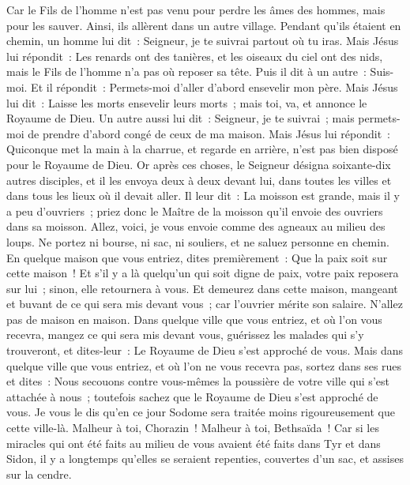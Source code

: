 \begin{multicols}{2}
Car le Fils de l'homme n'est pas venu pour perdre les âmes des hommes, mais pour les sauver. Ainsi, ils allèrent dans un autre village.
Pendant qu'ils étaient en chemin, un homme lui dit~: Seigneur, je te suivrai partout où tu iras.
Mais Jésus lui répondit~: Les renards ont des tanières, et les oiseaux du ciel ont des nids, mais le Fils de l'homme n'a pas où reposer sa tête.
Puis il dit à un autre~: Suis-moi. Et il répondit~: Permets-moi d'aller d'abord ensevelir mon père.
Mais Jésus lui dit~: Laisse les morts ensevelir leurs morts~; mais toi, va, et annonce le Royaume de Dieu.
Un autre aussi lui dit~: Seigneur, je te suivrai~; mais permets-moi de prendre d'abord congé de ceux de ma maison.
Mais Jésus lui répondit~: Quiconque met la main à la charrue, et regarde en arrière, n'est pas bien disposé pour le Royaume de Dieu.
\VerseOne{}Or après ces choses, le Seigneur désigna soixante-dix autres disciples, et il les envoya deux à deux devant lui, dans toutes les villes et dans tous les lieux où il devait aller.
Il leur dit~: La moisson est grande, mais il y a peu d'ouvriers~; priez donc le Maître de la moisson qu'il envoie des ouvriers dans sa moisson.
Allez, voici, je vous envoie comme des agneaux au milieu des loups.
Ne portez ni bourse, ni sac, ni souliers, et ne saluez personne en chemin.
En quelque maison que vous entriez, dites premièrement~: Que la paix soit sur cette maison~!
Et s'il y a là quelqu'un qui soit digne de paix, votre paix reposera sur lui~; sinon, elle retournera à vous.
Et demeurez dans cette maison, mangeant et buvant de ce qui sera mis devant vous~; car l'ouvrier mérite son salaire. N'allez pas de maison en maison.
Dans quelque ville que vous entriez, et où l'on vous recevra, mangez ce qui sera mis devant vous,
guérissez les malades qui s'y trouveront, et dites-leur~: Le Royaume de Dieu s'est approché de vous.
Mais dans quelque ville que vous entriez, et où l'on ne vous recevra pas, sortez dans ses rues et dites~:
Nous secouons contre vous-mêmes la poussière de votre ville qui s'est attachée à nous~; toutefois sachez que le Royaume de Dieu s'est approché de vous.
Je vous le dis qu'en ce jour Sodome sera traitée moins rigoureusement que cette ville-là.
Malheur à toi, Chorazin~! Malheur à toi, Bethsaïda~! Car si les miracles qui ont été faits au milieu de vous avaient été faits dans Tyr et dans Sidon, il y a longtemps qu'elles se seraient repenties, couvertes d'un sac, et assises sur la cendre.

\end{multicols}
